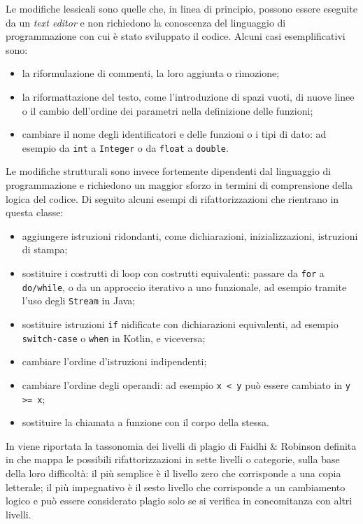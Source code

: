 Le modifiche lessicali sono quelle che, in linea di principio, possono essere eseguite da un \textit{text editor} e non richiedono la conoscenza del linguaggio di programmazione con cui è stato sviluppato il codice.
%
Alcuni casi esemplificativi sono:
\begin{itemize}
    \item la riformulazione di commenti, la loro aggiunta o rimozione;
    \item la riformattazione del testo, come l'introduzione di spazi vuoti, di nuove linee o il cambio dell'ordine dei parametri nella definizione delle funzioni;
    \item cambiare il nome degli identificatori e delle funzioni o i tipi di dato: ad esempio da \texttt{int} a \texttt{Integer} o da \texttt{float} a \texttt{double}.
\end{itemize}

Le modifiche strutturali sono invece fortemente dipendenti dal linguaggio di programmazione e richiedono un maggior sforzo in termini di comprensione della logica del codice.
%
Di seguito alcuni esempi di rifattorizzazioni che rientrano in questa classe:
\begin{itemize}
    \item aggiungere istruzioni ridondanti, come dichiarazioni, inizializzazioni, istruzioni di stampa;
    \item sostituire i costrutti di loop con costrutti equivalenti: passare da \texttt{for} a \texttt{do/while}, o da un approccio iterativo a uno funzionale, ad esempio tramite l'uso degli \texttt{Stream} in Java;
    \item sostituire istruzioni \texttt{if} nidificate con dichiarazioni equivalenti, ad esempio \texttt{switch-case} o \texttt{when} in Kotlin, e viceversa;
    \item cambiare l'ordine d'istruzioni indipendenti;
    \item cambiare l'ordine degli operandi: ad esempio \texttt{x < y} può essere cambiato in \texttt{y >= x};
    \item sostituire la chiamata a funzione con il corpo della stessa.
\end{itemize}

In  viene riportata la tassonomia dei livelli di plagio di Faidhi \& Robinson definita in \cite{faidhi-robinson-1987} che mappa le possibili rifattorizzazioni in sette livelli o categorie, sulla base della loro difficoltà: il più semplice è il livello zero che corrisponde a una copia letterale; il più impegnativo è il sesto livello che corrisponde a un cambiamento logico e può essere considerato plagio solo se si verifica in concomitanza con altri livelli.

